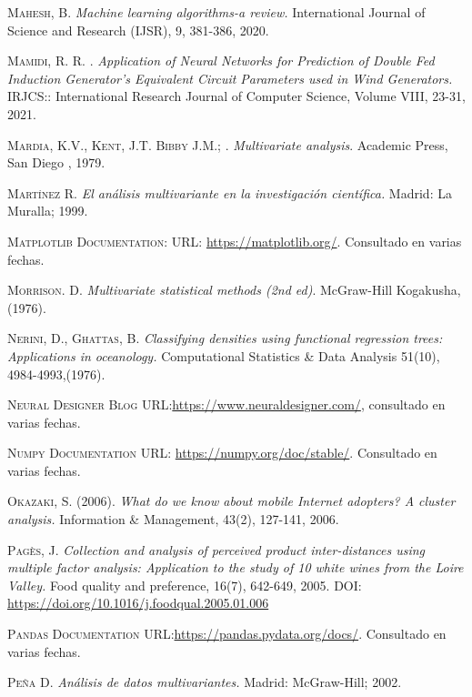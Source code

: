 \begin{thebibliography}{99}
\textsc{Mahesh, B. } \emph{Machine learning algorithms-a review.} International Journal of Science and Research (IJSR), 9, 381-386, 2020.

\textsc{Mamidi, R. R. }. \emph{Application of Neural Networks for Prediction of Double Fed Induction Generator’s Equivalent Circuit Parameters used in Wind Generators.} IRJCS:: International Research Journal of Computer Science, Volume VIII, 23-31, 2021.

\textsc{Mardia, K.V., Kent, J.T. Bibby J.M.; }. \emph{Multivariate analysis}. Academic Press, San Diego , 1979.

\textsc{Martínez R.} \emph{El análisis multivariante en la investigación científica.} Madrid: La Muralla; 1999.

\textsc{Matplotlib Documentation:} URL: \url{https://matplotlib.org/}. Consultado en varias fechas. 

\textsc{Morrison. D.}\textit{ Multivariate statistical methods (2nd ed)}. McGraw-Hill Kogakusha,(1976).

\textsc{Nerini, D.,  Ghattas, B. }\emph{ Classifying densities using functional regression trees: Applications in oceanology.} Computational Statistics \& Data Analysis 51(10), 4984-4993,(1976).

 \textsc{Neural Designer Blog} URL:\url{https://www.neuraldesigner.com/}, consultado en varias fechas.

\textsc{Numpy Documentation} URL: \url{https://numpy.org/doc/stable/}. Consultado en varias fechas.

\textsc{Okazaki, S. (2006).}\emph{ What do we know about mobile Internet adopters? A cluster analysis.} Information \& Management, 43(2), 127-141, 2006.

\textsc{Pagès, J. } \emph{Collection and analysis of perceived product inter-distances using multiple factor analysis: Application to the study of 10 white wines from the Loire Valley.} Food quality and preference, 16(7), 642-649, 2005. DOI: \url{https://doi.org/10.1016/j.foodqual.2005.01.006
}

 \textsc{Pandas Documentation} URL:\url{https://pandas.pydata.org/docs/}. Consultado en varias fechas.

\textsc{Peña D.} \emph{Análisis de datos multivariantes.} Madrid: McGraw-Hill; 2002.


\end{thebibliography}
